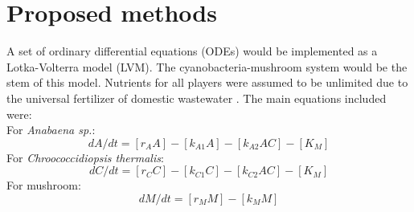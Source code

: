 \documentclass[a4paper, 11pt]{article}
\newcommand{\As}{\textit{Anabaena sp.}}
\newcommand{\Ct}{\textit{Chroococcidiopsis thermalis}}
\begin{document}
\section{Proposed methods}
A set of ordinary differential equations (ODEs) would be implemented as a Lotka-Volterra model (LVM).  The cyanobacteria-mushroom system \autocite{joshi2018bacterial} would be the stem of this model.  Nutrients for all players were assumed to be unlimited due to the universal fertilizer of domestic wastewater \autocite{markou2014microalgal}.  The main equations included were:\\
For \As:
\begin{equation}
	dA/dt = [r_A A] - [k_{A1} A] - [k_{A2} A C] - [K_M]
\end{equation}
For \Ct:
\begin{equation}
	dC/dt = [r_C C] - [k_{C1} C] - [k_{C2} A C] - [K_M]
\end{equation}
For mushroom:
\begin{equation}
	dM/dt = [r_M M] - [k_M M]
\end{equation}
\end{document}
